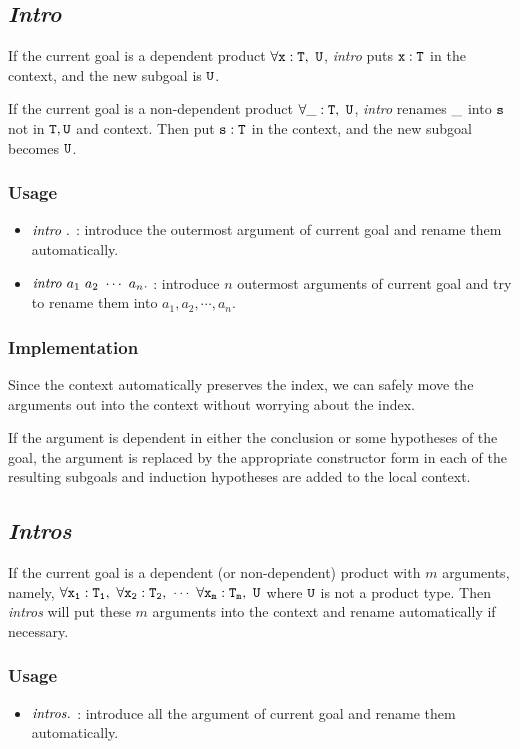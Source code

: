 \subsection{\it Intro}

If the current goal is a dependent product $\tt \forall x:T,\ U$, \textit{intro} puts 
$\tt x:T$ in the context, and the new subgoal is $\tt U$.\par
If the current goal is a non-dependent product $\tt \forall \_:T,\ U$, \textit{intro} renames
$\tt \_$ into $\tt s$ not in $\tt T,U$ and context. Then put $\tt s:T$ in the context, 
and the new subgoal becomes $\tt U$.

\subsubsection*{Usage}
\begin{itemize}
\item ${\it intro}\ .$ : introduce the outermost argument of current goal and rename them automatically.
\item ${\it intro}\ a_1\ a_2\ \cdots\ a_n.$ : introduce $n$ outermost arguments of current goal and
try to rename them into $a_1,a_2,\cdots,a_n$.
\end{itemize}

\subsubsection*{Implementation}
Since the context automatically preserves the index, we
can safely move the arguments out into the context without worrying about the index.

If the argument is dependent in either the conclusion or some hypotheses of the goal,
the argument is replaced by the appropriate constructor form in each of the resulting subgoals
and induction hypotheses are added to the local context.

\subsection{\it Intros}

If the current goal is a dependent (or non-dependent) product with $m$ arguments, namely,
$\tt \forall x_1:T_1,\ \forall x_2:T_2,\ \cdots\ \forall x_m:T_m,\ U$ where $\tt U$ is not a product type.
Then \textit{intros} will put these $m$ arguments into the context and rename automatically if necessary.

\subsubsection*{Usage}
\begin{itemize}
\item ${\it intros}.$ : introduce all the argument of current goal and rename them automatically.
\end{itemize}

